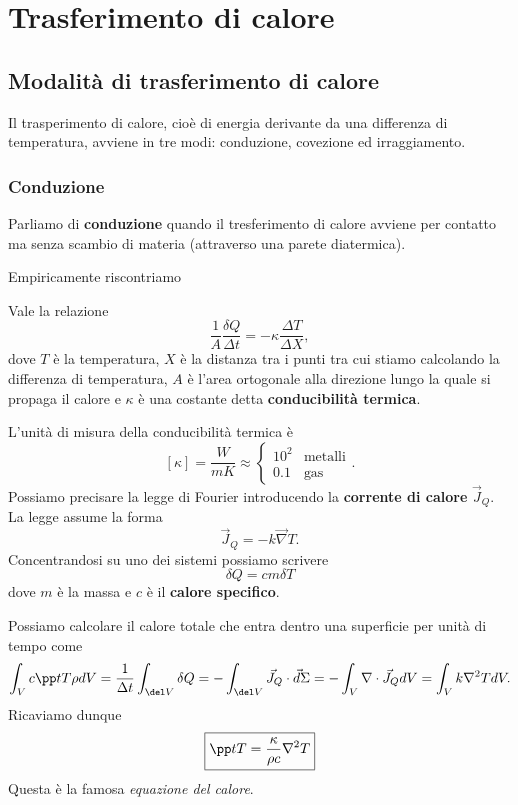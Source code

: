 \chapter{Trasferimento di calore}

\section{Modalit\`a di trasferimento di calore}
Il trasperimento di calore, cio\`e di energia derivante da una differenza di temperatura, avviene in tre modi: conduzione, covezione ed irraggiamento.

\subsection{Conduzione}
Parliamo di \textbf{conduzione} quando il tresferimento di calore avviene per contatto ma senza scambio di materia (attraverso una parete diatermica).\medskip

\noindent Empiricamente riscontriamo
\begin{fact}
Vale la relazione
\[\frac1A\frac{\delta Q}{\Delta t}=-\kappa\frac{\Delta T}{\Delta X},\]
dove $T$ \`e la temperatura, $X$ \`e la distanza tra i punti tra cui stiamo calcolando la differenza di temperatura, $A$ \`e l'area ortogonale alla direzione lungo la quale si propaga il calore e $\kappa$ \`e una costante detta \textbf{conducibilit\`a termica}.
\end{fact}

\noindent L'unit\`a di misura della conducibilit\`a termica \`e
\[[\kappa]=\frac W{mK}\approx \begin{cases}
10^2 &\text{metalli}\\
0.1 &\text{gas}
\end{cases}.\]
\noindent Possiamo precisare la legge di Fourier introducendo la
\textbf{corrente di calore} $\vec J_Q$. La legge assume la forma
\[\vec J_Q=-k\vec \nabla T.\]
Concentrandosi su uno dei sistemi possiamo scrivere
\[\boxed{\delta Q= cm\delta T}\]
dove $m$ \`e la massa e $c$ \`e il \textbf{calore specifico}.\bigskip

\noindent Possiamo calcolare il calore totale che entra dentro una superficie per unit\`a di tempo come
\[\int_V c\pp tT\rho dV=\frac1{\Delta t}\int_{\del V} \delta Q=-\int_{\del V} \vec J_Q\cdot \vec d\Sigma=-\int_V \nabla \cdot \vec J_Q dV=\int_Vk\nabla^2 T dV.\]
Ricaviamo dunque
\[\boxed{\pp tT=\frac{\kappa}{\rho c}\nabla^2T}\]
Questa \`e la famosa \textit{equazione del calore}.

